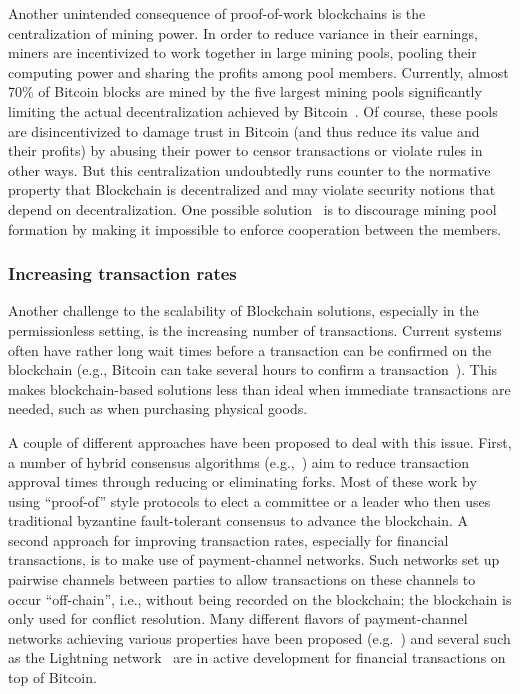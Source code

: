 Another unintended consequence of proof-of-work blockchains is the centralization of mining power.  In order to reduce variance in their earnings, miners are incentivized to work together in large mining pools, pooling their computing power and sharing the profits among pool members.  Currently, almost 70\% of Bitcoin blocks are mined by the five largest mining pools \cite{BlockchainInfoPools} significantly limiting the actual decentralization achieved by Bitcoin~\cite{arxiv:GBERS18}. Of course, these pools are disincentivized to damage trust in Bitcoin (and thus reduce its value and their profits) by abusing their power to censor transactions or violate rules in other ways. But this centralization undoubtedly runs counter to the normative property that Blockchain is decentralized and may violate security notions that depend on decentralization.  One possible solution~\cite{CCS:MKKS15} is to discourage mining pool formation by making it impossible to enforce cooperation between the members.

\subsubsection{Increasing transaction rates}
Another challenge to the scalability of Blockchain solutions, especially in the permissionless setting, is the increasing number of transactions.
Current systems often have rather long wait times before a transaction can be confirmed on the blockchain (e.g., Bitcoin can take several hours to confirm a transaction~\cite{BlockchainInfoTransactionConfTime}).  This makes blockchain-based solutions less than ideal when immediate transactions are needed, such as when purchasing physical goods.

A couple of different approaches have been proposed to deal with this issue.  First, a number of hybrid consensus algorithms (e.g.,~\cite{SOSP:GHMVZ17,OPODIS:AMNRS17,DISC:PasShi17,EC:PasShi18,NSDI:EGSR16}) aim to reduce transaction approval times through reducing or eliminating forks. Most of these work by using ``proof-of'' style protocols to elect a committee or a leader who then uses traditional byzantine fault-tolerant consensus to advance the blockchain.  A second approach for improving transaction rates, especially for financial transactions, is to make use of payment-channel networks. Such networks set up pairwise channels between parties to allow transactions on these channels to occur ``off-chain'', i.e., without being recorded on the blockchain; the blockchain is only used for conflict resolution.  Many different flavors of payment-channel networks achieving various properties have been proposed (e.g.~\cite{PooDry16, NDSS:HABSG17,CCS:KhaGer17,SYSTOR:LNEKPS18,CCS:MMKMR17,CCS:GreMie17}) and several such as the Lightning network~\cite{PooDry16} are in active development for financial transactions on top of Bitcoin.  

